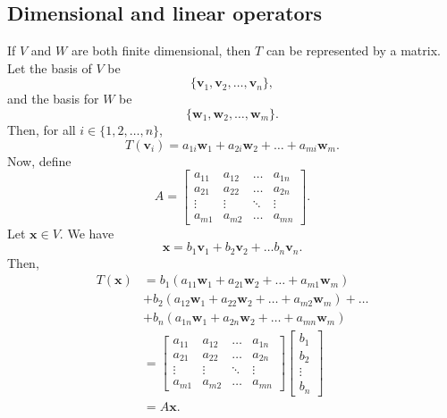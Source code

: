 \documentclass[a4paper, openany]{memoir}
\theoremstyle{definition}
\theoremstyle{plain}
\begin{document}
    \subsection{Dimensional and linear operators}
    If $V$ and $W$ are both finite dimensional, then $T$ can be represented by a matrix. Let the basis of $V$ be
    \[\{\bm{v}_1, \bm{v}_2, \dots, \bm{v}_n\},\]
    and the basis for $W$ be
    \[\{\bm{w}_1, \bm{w}_2, \dots, \bm{w}_m\}.\]
    Then, for all $i \in \{1, 2, \dots, n\}$,
    \[T(\bm{v}_i) = a_{1i} \bm{w}_1 + a_{2i} \bm{w}_2 + \dots + a_{mi} \bm{w}_m.\]
    Now, define
    \[A = \begin{bmatrix}
        a_{11} & a_{12} & \dots & a_{1n} \\
        a_{21} & a_{22} & \dots & a_{2n} \\
        \vdots & \vdots & \ddots & \vdots \\
        a_{m1} & a_{m2} & \dots & a_{mn} 
    \end{bmatrix}.\]
    Let $\bm{x} \in V$. We have
    \[\bm{x} = b_1\bm{v}_1 + b_2\bm{v}_2 + \dots b_n\bm{v}_n.\]
    Then,
    \begin{align*}
        T(\bm{x}) &= b_1(a_{11} \bm{w}_1 + a_{21} \bm{w}_2 + \dots + a_{m1} \bm{w}_m) \\
        &+ b_2(a_{12} \bm{w}_1 + a_{22} \bm{w}_2 + \dots + a_{m2} \bm{w}_m) + \dots \\
        &+ b_n(a_{1n} \bm{w}_1 + a_{2n} \bm{w}_2 + \dots + a_{mn} \bm{w}_m) \\
        &= \begin{bmatrix}
            a_{11} & a_{12} & \dots & a_{1n} \\
            a_{21} & a_{22} & \dots & a_{2n} \\
            \vdots & \vdots & \ddots & \vdots \\
            a_{m1} & a_{m2} & \dots & a_{mn} 
        \end{bmatrix} \begin{bmatrix}
            b_1 \\ b_2 \\ \vdots \\ b_n
        \end{bmatrix} \\
        &= A \bm{x}.
    \end{align*}
\end{document}
